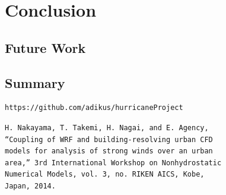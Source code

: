 \documentclass{l4proj}
\begin{document}
\chapter{Conclusion}
\label{chap:conclusion}

\section{Future Work}

\section{Summary}

\begin{appendices}

\begin{verbatim}
https://github.com/adikus/hurricaneProject
\end{verbatim}

\end{appendices}



	

\begin{verbatim}
H. Nakayama, T. Takemi, H. Nagai, and E. Agency,
“Coupling of WRF and building-resolving urban CFD
models for analysis of strong winds over an urban
area,” 3rd International Workshop on Nonhydrostatic
Numerical Models, vol. 3, no. RIKEN AICS, Kobe,
Japan, 2014.
\end{verbatim}
\end{document}
